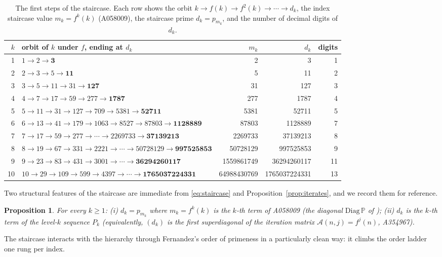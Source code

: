 \documentclass[11pt,a4paper]{article}
\theoremstyle{plain}
\newtheorem{proposition}[theorem]{Proposition}
\theoremstyle{definition}
\newcommand{\Pset}{\mathbb{P}}
\begin{document}
\begin{table}[htbp]
\centering
\footnotesize
\caption{The first steps of the staircase. Each row shows the orbit
$k\to f(k)\to f^{2}(k)\to\cdots\to d_k$, the index staircase value
$m_k=f^{k}(k)$ (A058009), the staircase prime $d_k=p_{m_k}$, and the number
of decimal digits of $d_k$.}
\label{tab:staircase}
\begin{tabular}{@{}rlrrr@{}}
\toprule
$k$ & orbit of $k$ under $f$, ending at $d_k$ & $m_k$ & $d_k$ & digits\\
\midrule
1 & $1\to2\to\mathbf{3}$ & 2 & 3 & 1\\
2 & $2\to3\to5\to\mathbf{11}$ & 5 & 11 & 2\\
3 & $3\to5\to11\to31\to\mathbf{127}$ & 31 & 127 & 3\\
4 & $4\to7\to17\to59\to277\to\mathbf{1787}$ & 277 & 1787 & 4\\
5 & $5\to11\to31\to127\to709\to5381\to\mathbf{52711}$ & 5381 & 52711 & 5\\
6 & $6\to13\to41\to179\to1063\to8527\to87803\to\mathbf{1128889}$ & 87803 & 1128889 & 7\\
7 & $7\to17\to59\to277\to\cdots\to2269733\to\mathbf{37139213}$ & 2269733 & 37139213 & 8\\
8 & $8\to19\to67\to331\to2221\to\cdots\to50728129\to\mathbf{997525853}$ & 50728129 & 997525853 & 9\\
9 & $9\to23\to83\to431\to3001\to\cdots\to\mathbf{36294260117}$ & 1559861749 & 36294260117 & 11\\
10 & $10\to29\to109\to599\to4397\to\cdots\to\mathbf{1765037224331}$ & 64988430769 & 1765037224331 & 13\\
\bottomrule
\end{tabular}
\end{table}

Two structural features of the staircase are immediate from
\eqref{eq:staircase} and Proposition~\ref{prop:iterates}, and we record them
for reference.

\begin{proposition}\label{prop:decomp}
For every $k\ge1$:
\emph{(i)} $d_k=p_{m_k}$ where $m_k=f^{k}(k)$ is the $k$-th term of A058009
(the diagonal $\mathrm{Diag}\,\Pset$ of \cite{MiskaTothZmija});
\emph{(ii)} $d_k$ is the $k$-th term of the level-$k$ sequence $P_k$
(equivalently, $(d_k)$ is the first superdiagonal of the iteration matrix
$\mathcal{A}(n,j)=f^{j}(n)$, A354967).
\end{proposition}

The staircase interacts with the hierarchy through Fernandez's order of
primeness in a particularly clean way: it climbs the order ladder one rung
per index.
\end{document}
